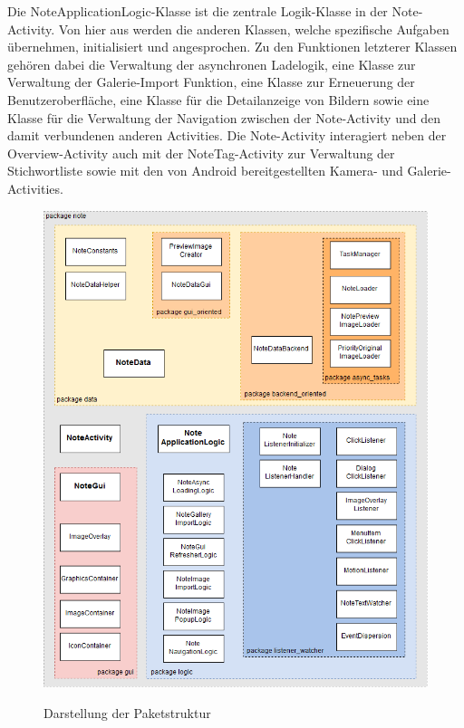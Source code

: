 Die NoteApplicationLogic-Klasse ist die zentrale Logik-Klasse in der Note-Activity. Von hier aus werden die anderen Klassen, welche spezifische Aufgaben übernehmen, initialisiert und angesprochen. Zu den Funktionen letzterer Klassen gehören dabei die Verwaltung der asynchronen Ladelogik, eine Klasse zur Verwaltung der Galerie-Import Funktion, eine Klasse zur Erneuerung der Benutzeroberfläche, eine Klasse für die Detailanzeige von Bildern sowie eine Klasse für die Verwaltung der Navigation zwischen der Note-Activity und den damit verbundenen anderen Activities. Die Note-Activity interagiert neben der Overview-Activity auch mit der NoteTag-Activity zur Verwaltung der Stichwortliste sowie mit den von Android bereitgestellten Kamera- und Galerie-Activities. 

\begin{figure}[H]
\centering
\begin{minipage}[t]{1\textwidth} %
\caption{Darstellung der Paketstruktur} %
\includegraphics[width=1 \textwidth]{img/notePackageDiagram}\\ %
\end{minipage}
\end{figure}


